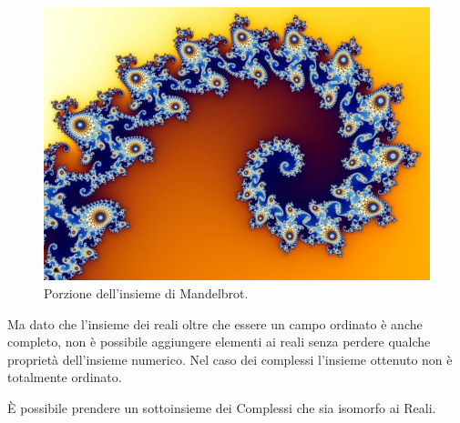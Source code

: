 \begin{figure}
\begin{center}
\begin{inaccessibleblock}
\includegraphics[scale=0.40]{img/fractal.jpg}
\end{inaccessibleblock}
\caption{Porzione dell'insieme di Mandelbrot.}
\label{fig:mandelbrot}
\end{center}
\end{figure}

Ma dato che l'insieme dei reali oltre che essere un campo ordinato è anche 
completo, non è possibile aggiungere elementi ai reali senza perdere 
qualche proprietà dell'insieme numerico. 
Nel caso dei complessi l'insieme ottenuto non è totalmente ordinato.

È possibile prendere un sottoinsieme dei Complessi che sia isomorfo ai Reali.

% 


\newpage %



% 
